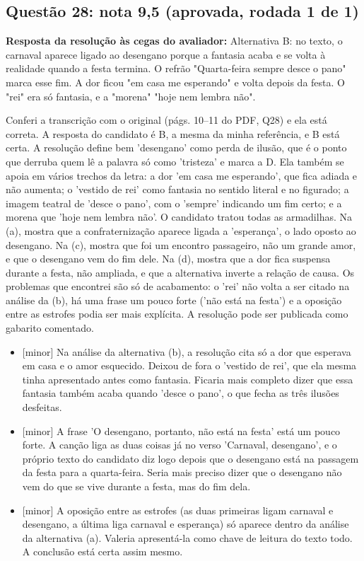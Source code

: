\documentclass{article}%
\begin{document}
\subsection*{Questão 28: nota 9,5 (aprovada, rodada 1 de 1)}%
\textbf{Resposta da resolução às cegas do avaliador:} Alternativa B: no texto, o carnaval aparece ligado ao desengano porque a fantasia acaba e se volta à realidade quando a festa termina. O refrão "Quarta{-}feira sempre desce o pano" marca esse fim. A dor ficou "em casa me esperando" e volta depois da festa. O "rei" era só fantasia, e a "morena" "hoje nem lembra não".\par %
Conferi a transcrição com o original (págs. 10--11 do PDF, Q28) e ela está correta. A resposta do candidato é B, a mesma da minha referência, e B está certa. A resolução define bem 'desengano' como perda de ilusão, que é o ponto que derruba quem lê a palavra só como 'tristeza' e marca a D. Ela também se apoia em vários trechos da letra: a dor 'em casa me esperando', que fica adiada e não aumenta; o 'vestido de rei' como fantasia no sentido literal e no figurado; a imagem teatral de 'desce o pano', com o 'sempre' indicando um fim certo; e a morena que 'hoje nem lembra não'. O candidato tratou todas as armadilhas. Na (a), mostra que a confraternização aparece ligada a 'esperança', o lado oposto ao desengano. Na (c), mostra que foi um encontro passageiro, não um grande amor, e que o desengano vem do fim dele. Na (d), mostra que a dor fica suspensa durante a festa, não ampliada, e que a alternativa inverte a relação de causa. Os problemas que encontrei são só de acabamento: o 'rei' não volta a ser citado na análise da (b), há uma frase um pouco forte ('não está na festa') e a oposição entre as estrofes podia ser mais explícita. A resolução pode ser publicada como gabarito comentado.%
\begin{itemize}%
\item%
{[}minor{]} Na análise da alternativa (b), a resolução cita só a dor que esperava em casa e o amor esquecido. Deixou de fora o 'vestido de rei', que ela mesma tinha apresentado antes como fantasia. Ficaria mais completo dizer que essa fantasia também acaba quando 'desce o pano', o que fecha as três ilusões desfeitas.%
\item%
{[}minor{]} A frase 'O desengano, portanto, não está na festa' está um pouco forte. A canção liga as duas coisas já no verso 'Carnaval, desengano', e o próprio texto do candidato diz logo depois que o desengano está na passagem da festa para a quarta{-}feira. Seria mais preciso dizer que o desengano não vem do que se vive durante a festa, mas do fim dela.%
\item%
{[}minor{]} A oposição entre as estrofes (as duas primeiras ligam carnaval e desengano, a última liga carnaval e esperança) só aparece dentro da análise da alternativa (a). Valeria apresentá{-}la como chave de leitura do texto todo. A conclusão está certa assim mesmo.%
\end{itemize}%
\end{document}
